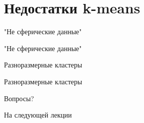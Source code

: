 \documentclass[10pt]{beamer}
\begin{document}
\section{Недостатки k-means}

\begin{frame}{"Не сферические данные"}
\end{frame}	

\begin{frame}{"Не сферические данные"}
\end{frame}

\begin{frame}{Разноразмерные кластеры}
\end{frame}

\begin{frame}{Разноразмерные кластеры}
\end{frame}

\begin{frame}[standout]
  Вопросы?
\end{frame}

\appendix

\begin{frame}{На следующей лекции}
\end{frame}
\end{document}
